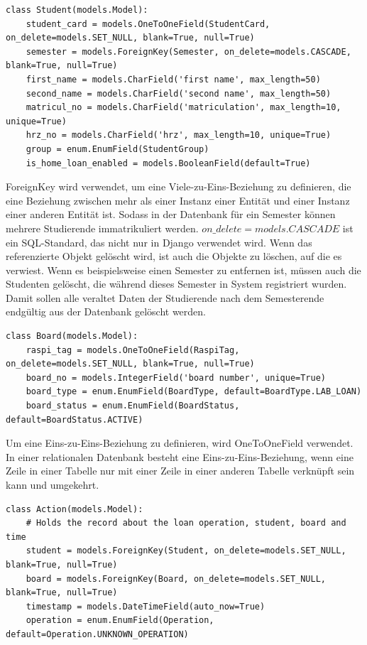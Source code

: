 \begin{lstlisting}[caption={Student Modell},captionpos=b]
class Student(models.Model):
	student_card = models.OneToOneField(StudentCard, on_delete=models.SET_NULL, blank=True, null=True)
	semester = models.ForeignKey(Semester, on_delete=models.CASCADE, blank=True, null=True)
	first_name = models.CharField('first name', max_length=50)
	second_name = models.CharField('second name', max_length=50)
	matricul_no = models.CharField('matriculation', max_length=10, unique=True)
	hrz_no = models.CharField('hrz', max_length=10, unique=True)
	group = enum.EnumField(StudentGroup)
	is_home_loan_enabled = models.BooleanField(default=True)
\end{lstlisting}
 ForeignKey wird verwendet, um eine Viele-zu-Eins-Beziehung zu definieren, die eine Beziehung zwischen mehr als einer Instanz einer Entität und einer Instanz einer anderen Entität ist. Sodass in der Datenbank für ein Semester können mehrere Studierende immatrikuliert werden. $on\_delete=models.CASCADE$ ist ein SQL-Standard, das nicht nur in Django verwendet wird. Wenn das referenzierte Objekt gelöscht wird, ist auch die Objekte zu löschen, auf die es verwiest. Wenn es beispielsweise einen Semester zu entfernen ist, müssen auch die Studenten gelöscht, die während dieses Semester in System registriert wurden. Damit sollen alle veraltet Daten der Studierende nach dem Semesterende endgültig aus der Datenbank gelöscht werden. 
\begin{lstlisting}[caption={Board Modell},captionpos=b]
class Board(models.Model):
	raspi_tag = models.OneToOneField(RaspiTag, on_delete=models.SET_NULL, blank=True, null=True)
	board_no = models.IntegerField('board number', unique=True)
	board_type = enum.EnumField(BoardType, default=BoardType.LAB_LOAN)
	board_status = enum.EnumField(BoardStatus, default=BoardStatus.ACTIVE)
 \end{lstlisting}
Um eine Eins-zu-Eins-Beziehung zu definieren, wird OneToOneField verwendet. In einer relationalen Datenbank besteht eine Eins-zu-Eins-Beziehung, wenn eine Zeile in einer Tabelle nur mit einer Zeile in einer anderen Tabelle verknüpft sein kann und umgekehrt.
\begin{lstlisting}[caption={Action Modell},captionpos=b]
class Action(models.Model):
	# Holds the record about the loan operation, student, board and time
	student = models.ForeignKey(Student, on_delete=models.SET_NULL, blank=True, null=True)
	board = models.ForeignKey(Board, on_delete=models.SET_NULL, blank=True, null=True)
	timestamp = models.DateTimeField(auto_now=True)
	operation = enum.EnumField(Operation, default=Operation.UNKNOWN_OPERATION)
\end{lstlisting}
